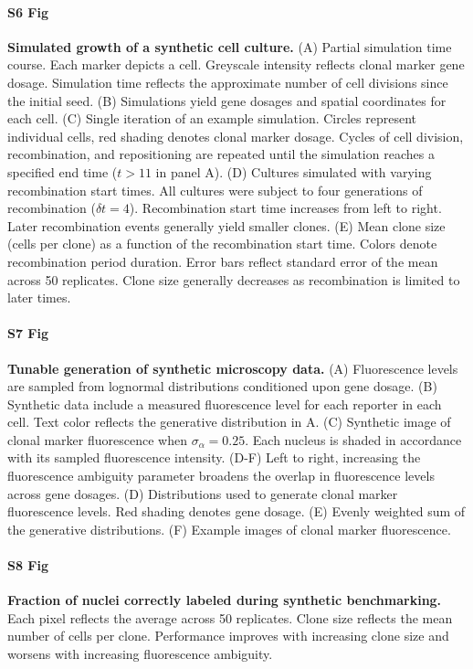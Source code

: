 \documentclass[10pt,letterpaper]{article}
\begin{document}
\paragraph*{S6 Fig} 
\label{S6_Fig} 
{\bf Simulated growth of a synthetic cell culture.} (A) Partial simulation time course. Each marker depicts a cell. Greyscale intensity reflects clonal marker gene dosage. Simulation time reflects the approximate number of cell divisions since the initial seed. (B) Simulations yield gene dosages and spatial coordinates for each cell. (C) Single iteration of an example simulation. Circles represent individual cells, red shading denotes clonal marker dosage. Cycles of cell division, recombination, and repositioning are repeated until the simulation reaches a specified end time ($t>11$ in panel A). (D) Cultures simulated with varying recombination start times. All cultures were subject to four generations of recombination ($\delta t=4$). Recombination start time increases from left to right. Later recombination events generally yield smaller clones. (E) Mean clone size (cells per clone) as a function of the recombination start time. Colors denote recombination period duration. Error bars reflect standard error of the mean across 50 replicates. Clone size generally decreases as recombination is limited to later times.

\paragraph*{S7 Fig} 
\label{S7_Fig} 
{\bf Tunable generation of synthetic microscopy data.} (A) Fluorescence levels are sampled from lognormal distributions conditioned upon gene dosage. (B) Synthetic data include a measured fluorescence level for each reporter in each cell. Text color reflects the generative distribution in A. (C) Synthetic image of clonal marker fluorescence when $\sigma_{\alpha}=0.25$. Each nucleus is shaded in accordance with its sampled fluorescence intensity. (D-F) Left to right, increasing the fluorescence ambiguity parameter broadens the overlap in fluorescence levels across gene dosages. (D) Distributions used to generate clonal marker fluorescence levels. Red shading denotes gene dosage. (E) Evenly weighted sum of the generative distributions. (F) Example images of clonal marker fluorescence.

\paragraph*{S8 Fig} 
\label{S8_Fig}
{\bf Fraction of nuclei correctly labeled during synthetic benchmarking.}
Each pixel reflects the average across 50 replicates. Clone size reflects the mean number of cells per clone. Performance improves with increasing clone size and worsens with increasing fluorescence ambiguity.
\end{document}
